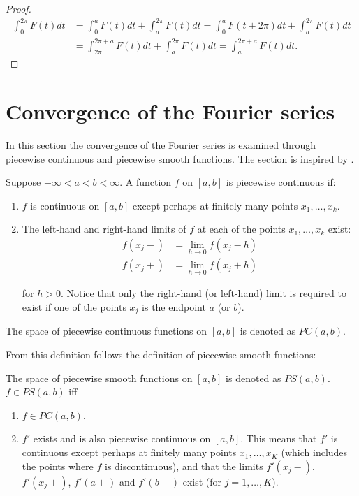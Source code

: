 \begin{proof}
\begin{align*}
	\int_0^{2\pi} F(t)dt 
	&= \int_0^a F(t) dt + \int_a^{2\pi} F(t) dt
	= \int_0^a F(t+2\pi)dt + \int_a^{2\pi} F(t) dt\\ 
	&= \int_{2\pi}^{2\pi + a} F(t) dt + \int_a^{2\pi}F(t)dt
	= \int_a^{2\pi+a}F(t)dt.
\end{align*}
\end{proof}

\section{Convergence of the Fourier series}
In this section the convergence of the Fourier series is examined through piecewise continuous and piecewise smooth functions. The section is inspired by \cite{page 31-36, FAA}.

\begin{definition}
Suppose $-\infty < a < b < \infty$. A function $f$ on $[a,b]$ is piecewise continuous if:
\begin{enumerate}
\item $f$ is continuous on $[a,b]$ except perhaps at finitely many points $x_1, \dots, x_k$.
\item The left-hand and right-hand limits of $f$ at each of the points $x_1, \dots, x_k$ exist:
\begin{align*}
f(x_j-) &= \lim_{h\to 0} f(x_j - h) \\
f(x_j+) &= \lim_{h\to 0} f(x_j + h)
\end{align*}

for $h > 0$. Notice that only the right-hand (or left-hand) limit is required to exist if one of the points $x_j$ is the endpoint $a$ (or $b$).
\end{enumerate}

The space of piecewise continuous functions on $[a,b]$ is denoted as $PC(a,b)$.
\end{definition}
\newpage
From this definition follows the definition of piecewise smooth functions:
\begin{definition}
The space of piecewise smooth functions on $[a,b]$ is denoted as $PS(a,b)$. $f\in PS(a,b)$ iff
\begin{enumerate}
	\item $f \in PC(a,b)$.
	\item $f'$ exists and is also piecewise continuous on $[a,b]$. This means that $f'$ is continuous except perhaps at finitely many points $x_1, \dots, x_K$ (which includes the points where $f$ is discontinuous), and that the limits $f'(x_j-)$, $f'(x_j+)$, $f'(a+)$ and $f'(b-)$ exist (for $j = 1,\dots, K$).
\end{enumerate}
\end{definition}

